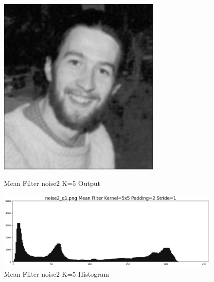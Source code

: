 \documentclass[12pt,a4paper]{report}
\begin{document}
\begin{figure}[!htb]
  \includegraphics[width=1\linewidth]{output/noise2_q1_K5P2.png}
  \caption{Mean Filter noise2 K=5 Output}
  \includegraphics[width=1\linewidth]{output/noise2_q1_K5P2_his.png}
  \caption{Mean Filter noise2 K=5 Histogram}
\end{figure}
\end{document}
